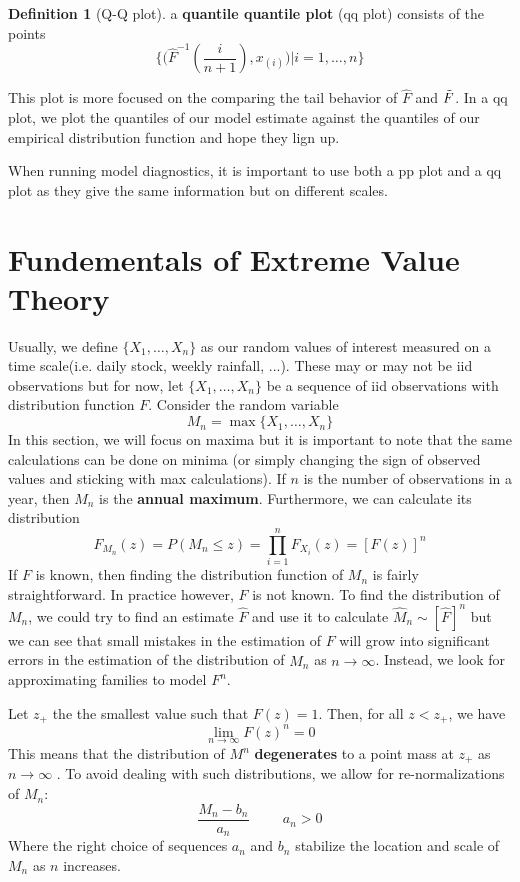\documentclass{article}
\theoremstyle{definition}
\theoremstyle{definition}
\newtheorem{definition}{Definition}
\def\Xs{\{X_1, \hdots, X_n\}}
\def\inv{^{-1}}
\begin{document}
\begin{definition}[Q-Q plot] a \textbf{quantile quantile plot} (qq plot) consists of the points 
\[ \Bigg\{ \bigg(\hat{F}\inv (\frac{i}{n+1}), x_{(i)}\bigg)| i=1, \hdots, n \Bigg\}\]

This plot is more focused on the comparing the tail behavior of $\hat{F}$ and $\Tilde{F}$. In a qq plot, we plot the quantiles of our model estimate against the quantiles of our empirical distribution function and hope they lign up.
\end{definition}
When running model diagnostics, it is important to use both a pp plot and a qq plot as they give the same information but on different scales.

\section{Fundementals of Extreme Value Theory}
Usually, we define $\Xs$ as our random values of interest measured on a time scale(i.e. daily stock, weekly rainfall, ...). These may or may not be iid observations but for now, let $\Xs$ be a sequence of iid observations with distribution function $F$. Consider the random variable
\[M_n=\max\Xs\]
In this section, we will focus on maxima but it is important to note that the same calculations can be done on minima (or simply changing the sign of observed values and sticking with max calculations). If $n$ is the number of observations in a year, then $M_n$ is the \textbf{annual maximum}. Furthermore, we can calculate its distribution
\[F_{M_n}(z)=P(M_n\leq z)= \prod_{i=1}^nF_{X_i}(z)=[F(z)]^n\]
If $F$ is known, then finding the distribution function of $M_n$ is fairly straightforward. In practice however, $F$ is not known. To find the distribution of $M_n$, we could try to find an estimate $\hat{F}$ and use it to calculate $\hat{M}_n\sim [\hat{F}]^n$ but we can see that small mistakes in the estimation of $F$ will grow into significant errors in the estimation of the distribution of $\hat{M}_n$ as $n \rightarrow \infty$. Instead, we look for approximating families to model $F^n$.

Let $z_+ $ the the smallest value such that $F(z)=1$. Then, for all $z<z_+$, we have 
\[\lim_{n\rightarrow \infty}F(z)^n=0\]
This means that the distribution of $M^n$ \textbf{degenerates} to a point mass at $z_+$ as $n\rightarrow \infty$ . To avoid dealing with such distributions, we allow for re-normalizations of $M_n$:
\[\frac{M_n- b_n}{a_n} \hspace{1cm} a_n>0\]
Where the right choice of sequences $a_n$ and $b_n$ stabilize the location and scale of $M_n$ as $n$ increases.
\end{document}
